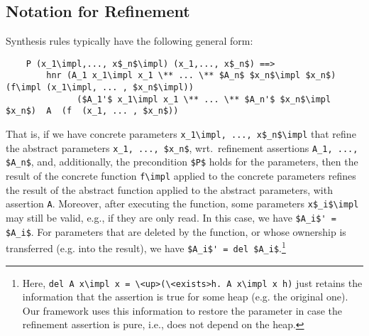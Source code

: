 \documentclass[acmsmall]{acmart}
\newcommand{\is}{\lstinline[language=isabelle]}
\begin{document}





\subsection{Notation for Refinement}

Synthesis rules typically have the following general form:

\begin{lstlisting}
    P (x_1\impl,..., x$_n$\impl) (x_1,..., x$_n$) ==> 
        hnr (A_1 x_1\impl x_1 \** ... \** $A_n$ $x_n$\impl $x_n$)      (f\impl (x_1\impl, ... , $x_n$\impl)) 
              ($A_1'$ x_1\impl x_1 \** ... \** $A_n'$ $x_n$\impl $x_n$)  A  (f  (x_1, ... , $x_n$))
\end{lstlisting}
That is, if  we have concrete parameters \is{x_1\impl, ..., x$_n$\impl} that refine the abstract parameters \is{x_1, ..., $x_n$}, wrt.\ refinement assertions \is{A_1, ..., $A_n$}, and, additionally, the precondition \is{$P$} holds for the parameters, then the result of the concrete function \is$f\impl$ applied to the concrete parameters refines the result of the abstract function applied to the abstract parameters, with assertion \is$A$. 
Moreover, after executing the function, some parameters \is{x$_i$\impl} may still be valid, e.g., if they are only read. In this case, we have \is{$A_i$' = $A_i$}. For parameters that are deleted by the function, or whose ownership is transferred (e.g. into the result), we have \is{$A_i$' = del $A_i$}.\cprotect\footnote{Here, \is{del A x\impl x = \<up>(\<exists>h. A x\impl x h)} just retains the information that the assertion is true for some heap (e.g. the original one). Our framework uses this information to restore the parameter in case the refinement assertion is pure, i.e., does not depend on the heap.}
\end{document}
